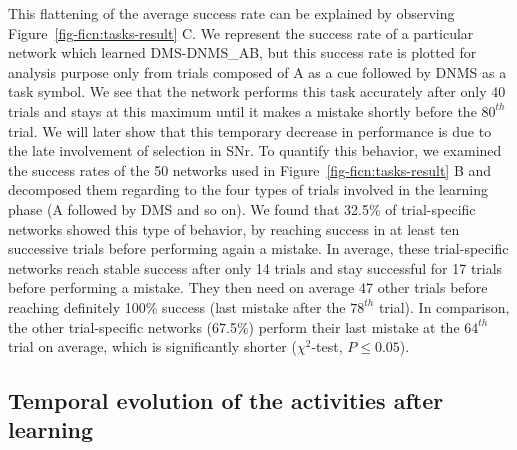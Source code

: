 \documentclass[
  11pt,
  a4paper,
]{scrbook}
\begin{document}
This flattening of the average success rate can be explained by
observing Figure~\ref{fig-ficn:tasks-result} C. We represent the success
rate of a particular network which learned DMS-DNMS\_AB, but this
success rate is plotted for analysis purpose only from trials composed
of A as a cue followed by DNMS as a task symbol. We see that the network
performs this task accurately after only 40 trials and stays at this
maximum until it makes a mistake shortly before the \(80^{th}\) trial.
We will later show that this temporary decrease in performance is due to
the late involvement of selection in SNr. To quantify this behavior, we
examined the success rates of the 50 networks used in
Figure~\ref{fig-ficn:tasks-result} B and decomposed them regarding to
the four types of trials involved in the learning phase (A followed by
DMS and so on). We found that 32.5\% of trial-specific networks showed
this type of behavior, by reaching success in at least ten successive
trials before performing again a mistake. In average, these
trial-specific networks reach stable success after only 14 trials and
stay successful for 17 trials before performing a mistake. They then
need on average 47 other trials before reaching definitely 100\% success
(last mistake after the \(78^{th}\) trial). In comparison, the other
trial-specific networks (67.5\%) perform their last mistake at the
\(64^{th}\) trial on average, which is significantly shorter
(\(\chi^2\)-test, \(P \leq 0.05\)).

\subsection{Temporal evolution of the activities after
learning}\label{temporal-evolution-of-the-activities-after-learning}
\end{document}
